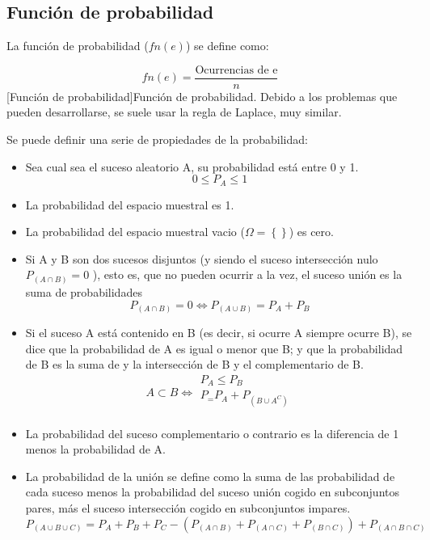 \subsection{Función de probabilidad}
La función de probabilidad ($fn(e)$) se define como:
\begin{center}
    \begin{equation}
       fn(e) = \dfrac{\mbox{Ocurrencias de e}}{n}
    \end{equation}
    [Función de probabilidad]{Función de probabilidad. Debido a los problemas que pueden desarrollarse, se suele usar la regla de Laplace, muy similar.}
\end{center}

Se puede definir una serie de propiedades de la probabilidad:
\begin{itemize}[itemsep=0pt,parsep=0pt,topsep=0pt,partopsep=0pt]
    \item Sea cual sea el suceso aleatorio A, su probabilidad está entre 0 y 1.
        \[ 0 \leq P_A \leq 1 \]
    \item La probabilidad del espacio muestral es 1.
    \item La probabilidad del espacio muestral vacio ($\Omega = \left\lbrace \right\rbrace $)  es cero.
    \item Si A y B son dos sucesos disjuntos  (y siendo el suceso intersección nulo $P_{\left( A\cap B\right) } = 0$ ), esto es, que no pueden ocurrir a la vez, el suceso unión es la suma de probabilidades
        \[ P_{\left( A\cap B\right) } = 0 \iff P_{\left( A\cup B\right) } = P_A + P_B \]
    \item Si el suceso A está contenido en B (es decir, si ocurre A siempre ocurre B), se dice que la probabilidad de A es igual o menor que B; y que la probabilidad de B es la suma de y la intersección de B y el complementario de B.
        \begin{equation*}
            A \subset B \iff
             \begin{array}{c}
                    P_A \leq P_B\\
                    P_ = P_A + P_{\left( B\cup A^C\right) }\\
            \end{array}
        \end{equation*}
    \item La probabilidad del suceso complementario o contrario es la diferencia de 1 menos la probabilidad de A.
    \item La probabilidad de la unión se define como la suma de las probabilidad de cada suceso menos la probabilidad del suceso unión cogido en subconjuntos pares, más el suceso intersección cogido en subconjuntos impares.
        \[ P_{\left( A\cup B\cup C\right) } = P_A + P_B + P_C - \left( P_{\left( A\cap B\right) } + P_{\left( A\cap C\right) }  + P_{\left( B\cap C\right) } \right)  + P_{\left( A\cap B\cap C\right) } \]
\end{itemize}
